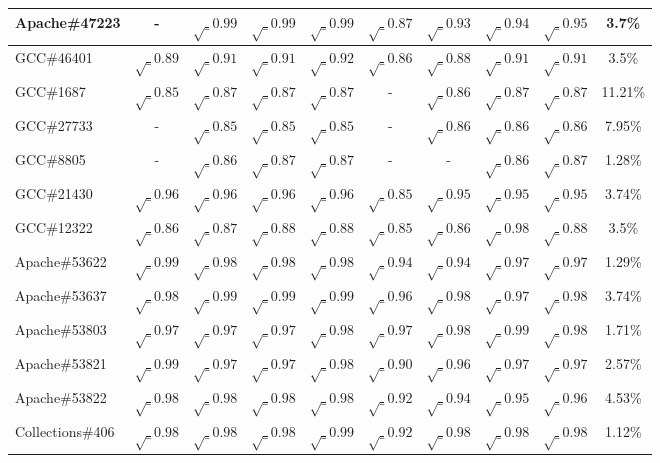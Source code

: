 \begin{table}[h!]
\begin{tabular}{lccccccccc}
    Apache\#47223     & -  & $\surd_{0.99}$ & $\surd_{0.99}$ & $\surd_{0.99}$ &$\surd_{0.87}$ & $\surd_{0.93}$ & $\surd_{0.94}$ & $\surd_{0.95}$ & 3.7\% \\
    \midrule
    GCC\#46401       & $\surd_{0.89}$  & $\surd_{0.91}$ & $\surd_{0.91}$ & $\surd_{0.92}$ & $\surd_{0.86}$ & $\surd_{0.88}$ & $\surd_{0.91}$ & $\surd_{0.91}$ & 3.5\% \\
    GCC\#1687        & $\surd_{0.85}$  & $\surd_{0.87}$ & $\surd_{0.87}$ & $\surd_{0.87}$ & - & $\surd_{0.86}$ & $\surd_{0.87}$ & $\surd_{0.87}$ & 11.21\% \\
    GCC\#27733       & -  & $\surd_{0.85}$ & $\surd_{0.85}$ & $\surd_{0.85}$ & - & $\surd_{0.86}$ & $\surd_{0.86}$ & $\surd_{0.86}$ & 7.95\% \\
    GCC\#8805        & -  & $\surd_{0.86}$ &$\surd_{0.87}$ &$\surd_{0.87}$ & - & - & $\surd_{0.86}$ &$\surd_{0.87}$ & 1.28\% \\
    GCC\#21430       & $\surd_{0.96}$  & $\surd_{0.96}$ & $\surd_{0.96}$ & $\surd_{0.96}$ & $\surd_{0.85}$ & $\surd_{0.95}$ & $\surd_{0.95}$ & $\surd_{0.95}$ & 3.74\% \\
    GCC\#12322       & $\surd_{0.86}$  &$\surd_{0.87}$ & $\surd_{0.88}$ & $\surd_{0.88}$ & $\surd_{0.85}$ & $\surd_{0.86}$ & $\surd_{0.98}$ & $\surd_{0.88}$ & 3.5\% \\
    \midrule
    \midrule
    Apache\#53622      & $\surd_{0.99}$  & $\surd_{0.98}$ & $\surd_{0.98}$ & $\surd_{0.98}$ & $\surd_{0.94}$ & $\surd_{0.94}$ & $\surd_{0.97}$ & $\surd_{0.97}$ & 1.29\% \\
    Apache\#53637     & $\surd_{0.98}$  & $\surd_{0.99}$ & $\surd_{0.99}$ & $\surd_{0.99}$ & $\surd_{0.96}$ & $\surd_{0.98}$ & $\surd_{0.97}$ & $\surd_{0.98}$ & 3.74\% \\
    Apache\#53803      & $\surd_{0.97}$  & $\surd_{0.97}$ & $\surd_{0.97}$ & $\surd_{0.98}$ & $\surd_{0.97}$ & $\surd_{0.98}$ & $\surd_{0.99}$ & $\surd_{0.98}$ & 1.71\% \\
    Apache\#53821      & $\surd_{0.99}$  & $\surd_{0.97}$ & $\surd_{0.97}$ & $\surd_{0.98}$ & $\surd_{0.90}$ & $\surd_{0.96}$ & $\surd_{0.97}$ & $\surd_{0.97}$ & 2.57\% \\
    Apache\#53822      & $\surd_{0.98}$  & $\surd_{0.98}$ & $\surd_{0.98}$ & $\surd_{0.98}$ & $\surd_{0.92}$ & $\surd_{0.94}$ & $\surd_{0.95}$ & $\surd_{0.96}$ & 4.53\% \\
    \midrule
    Collections\#406    & $\surd_{0.98}$  & $\surd_{0.98}$ & $\surd_{0.98}$ & $\surd_{0.99}$ & $\surd_{0.92}$ & $\surd_{0.98}$ & $\surd_{0.98}$ & $\surd_{0.98}$ & 1.12\% \\

\end{tabular}
\end{table}
